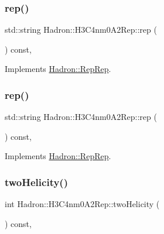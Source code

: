 \subsubsection{\texorpdfstring{rep()}{rep()}\hspace{0.1cm}{\footnotesize\ttfamily [4/5]}}
{\footnotesize\ttfamily std\+::string Hadron\+::\+H3\+C4nm0\+A2\+Rep\+::rep (\begin{DoxyParamCaption}{ }\end{DoxyParamCaption}) const\hspace{0.3cm}{\ttfamily [inline]}, {\ttfamily [virtual]}}



Implements \mbox{\hyperlink{structHadron_1_1RepRep_ab3213025f6de249f7095892109575fde}{Hadron\+::\+Rep\+Rep}}.

\mbox{\label{structHadron_1_1H3C4nm0A2Rep_ab4e5ed700d7f03a7c2b8368304277671}} 
\subsubsection{\texorpdfstring{rep()}{rep()}\hspace{0.1cm}{\footnotesize\ttfamily [5/5]}}
{\footnotesize\ttfamily std\+::string Hadron\+::\+H3\+C4nm0\+A2\+Rep\+::rep (\begin{DoxyParamCaption}{ }\end{DoxyParamCaption}) const\hspace{0.3cm}{\ttfamily [inline]}, {\ttfamily [virtual]}}



Implements \mbox{\hyperlink{structHadron_1_1RepRep_ab3213025f6de249f7095892109575fde}{Hadron\+::\+Rep\+Rep}}.

\mbox{\label{structHadron_1_1H3C4nm0A2Rep_a84b0324c5ce0fc4024042887f259aa7d}} 
\subsubsection{\texorpdfstring{twoHelicity()}{twoHelicity()}\hspace{0.1cm}{\footnotesize\ttfamily [1/3]}}
{\footnotesize\ttfamily int Hadron\+::\+H3\+C4nm0\+A2\+Rep\+::two\+Helicity (\begin{DoxyParamCaption}{ }\end{DoxyParamCaption}) const\hspace{0.3cm}{\ttfamily [inline]}, {\ttfamily [virtual]}}

